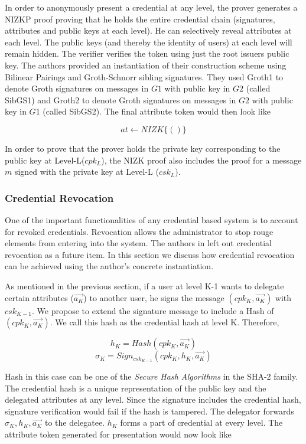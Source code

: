 \documentclass[journal]{IEEEtran}
\begin{document}
In order to anonymously present a credential at any level, the prover generates a NIZKP proof proving that he holds the entire credential chain (signatures, attributes and public keys at each level). He can selectively reveal attributes at each level. The public keys (and thereby the identity of users) at each level will remain hidden. The verifier verifies the token using just the root issuers public key. The authors provided an instantiation of their construction scheme using Bilinear Pairings and Groth-Schnorr sibling signatures. They used Groth1 to denote Groth signatures on messages in $G1$ with public key in $G2$ (called SibGS1) and Groth2 to denote Groth signatures on messages in $G2$ with public key in $G1$ (called SibGS2). The final attribute token would then look like

$$
at \leftarrow NIZK \lbrace(  )\rbrace
$$

In order to prove that the prover holds the private key corresponding to the public key at Level-L($cpk_L$), the NIZK proof also includes the proof for a message $m$ signed with the private key at Level-L ($csk_L$).

\subsubsection{Credential Revocation}
One of the important functionalities of any credential based system is to account for revoked credentials. Revocation allows the administrator to stop rouge elements from entering into the system. The authors in \citep{CamenischDD17} left out credential revocation as a future item. In this section we discuss how credential revocation can be achieved using the author's concrete instantiation.

As mentioned in the previous section, if a user at level K-1 wants to delegate certain attributes ($\overrightarrow{a_K}$) to another user, he signs the message $(cpk_K,\overrightarrow{a_K})$ with $csk_{K-1}$. We propose to extend the signature message to include a Hash of $(cpk_K , \overrightarrow{a_K})$. We call this hash as the credential hash at level K. Therefore,

$$
h_K = Hash(cpk_K,\overrightarrow{a_K})
$$
$$
\sigma_K = Sign_{csk_{K-1}}(cpk_K,h_K,\overrightarrow{a_K})
$$

Hash in this case can be one of the \textit{Secure Hash Algorithms} in the SHA-2 family. The credential hash is a unique representation of the public key and the delegated attributes at any level. Since the signature includes the credential hash, signature verification would fail if the hash is tampered. The delegator forwards $\sigma_K, h_K, \overrightarrow{a_K}$ to the delegatee. $h_K$ forms a part of credential at every level. The attribute token generated for presentation would now look like
\end{document}
